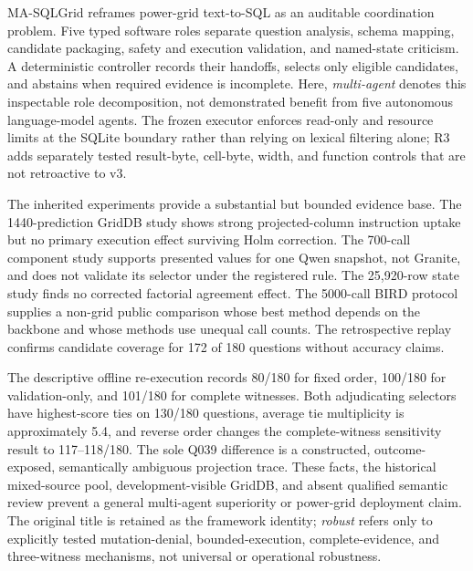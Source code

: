 \documentclass[applsci,article,submit,moreauthors]{Definitions/mdpi}
\newcommand{\masql}{MA-SQLGrid}
\begin{document}
\masql{} reframes power-grid text-to-SQL as an auditable coordination problem. Five typed software roles separate question analysis, schema mapping, candidate packaging, safety and execution validation, and named-state criticism. A deterministic controller records their handoffs, selects only eligible candidates, and abstains when required evidence is incomplete. Here, \emph{multi-agent} denotes this inspectable role decomposition, not demonstrated benefit from five autonomous language-model agents. The frozen executor enforces read-only and resource limits at the SQLite boundary rather than relying on lexical filtering alone; R3 adds separately tested result-byte, cell-byte, width, and function controls that are not retroactive to v3.

The inherited experiments provide a substantial but bounded evidence base. The 1440-prediction GridDB study shows strong projected-column instruction uptake but no primary execution effect surviving Holm correction. The 700-call component study supports presented values for one Qwen snapshot, not Granite, and does not validate its selector under the registered rule. The 25,920-row state study finds no corrected factorial agreement effect. The 5000-call BIRD protocol supplies a non-grid public comparison whose best method depends on the backbone and whose methods use unequal call counts. The retrospective replay confirms candidate coverage for 172 of 180 questions without accuracy claims.

The descriptive offline re-execution records 80/180 for fixed order, 100/180 for validation-only, and 101/180 for complete witnesses. Both adjudicating selectors have highest-score ties on 130/180 questions, average tie multiplicity is approximately 5.4, and reverse order changes the complete-witness sensitivity result to 117--118/180. The sole Q039 difference is a constructed, outcome-exposed, semantically ambiguous projection trace. These facts, the historical mixed-source pool, development-visible GridDB, and absent qualified semantic review prevent a general multi-agent superiority or power-grid deployment claim. The original title is retained as the framework identity; \emph{robust} refers only to explicitly tested mutation-denial, bounded-execution, complete-evidence, and three-witness mechanisms, not universal or operational robustness.
\end{document}
